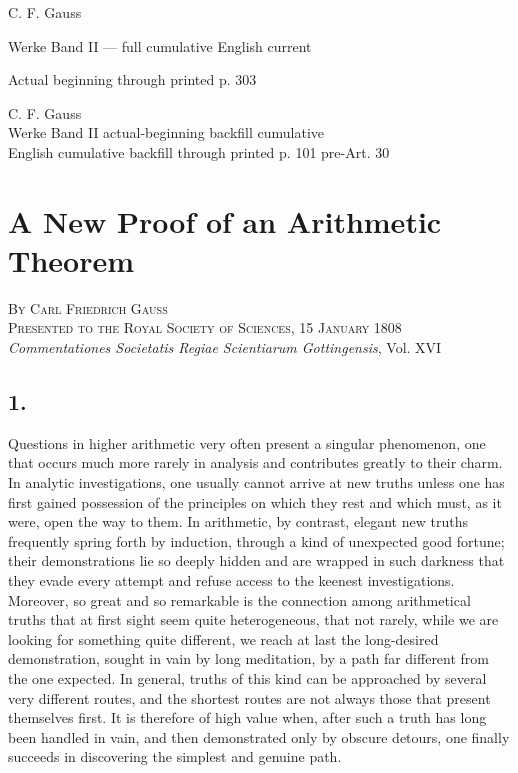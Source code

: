 \documentclass[12pt]{article}
\begin{document}
\begin{center}
{\Large C. F. Gauss}\par
{\large Werke Band II — full cumulative English current}\par
{\large Actual beginning through printed p. 303}
\end{center}



\begin{center}
{\Large C. F. Gauss}\\[3pt]
{\large Werke Band II actual-beginning backfill cumulative}\\[3pt]
{\large English cumulative backfill through printed p. 101 pre-Art. 30}
\end{center}


\section*{A New Proof of an Arithmetic Theorem}

\begin{center}
\textsc{By Carl Friedrich Gauss}\\
\textsc{Presented to the Royal Society of Sciences, 15 January 1808}\\[3pt]
\emph{Commentationes Societatis Regiae Scientiarum Gottingensis}, Vol. XVI
\end{center}

\subsection*{1.}

Questions in higher arithmetic very often present a singular phenomenon, one that occurs much more rarely in analysis and contributes greatly to their charm. In analytic investigations, one usually cannot arrive at new truths unless one has first gained possession of the principles on which they rest and which must, as it were, open the way to them. In arithmetic, by contrast, elegant new truths frequently spring forth by induction, through a kind of unexpected good fortune; their demonstrations lie so deeply hidden and are wrapped in such darkness that they evade every attempt and refuse access to the keenest investigations. Moreover, so great and so remarkable is the connection among arithmetical truths that at first sight seem quite heterogeneous, that not rarely, while we are looking for something quite different, we reach at last the long-desired demonstration, sought in vain by long meditation, by a path far different from the one expected. In general, truths of this kind can be approached by several very different routes, and the shortest routes are not always those that present themselves first. It is therefore of high value when, after such a truth has long been handled in vain, and then demonstrated only by obscure detours, one finally succeeds in discovering the simplest and genuine path.
\end{document}
